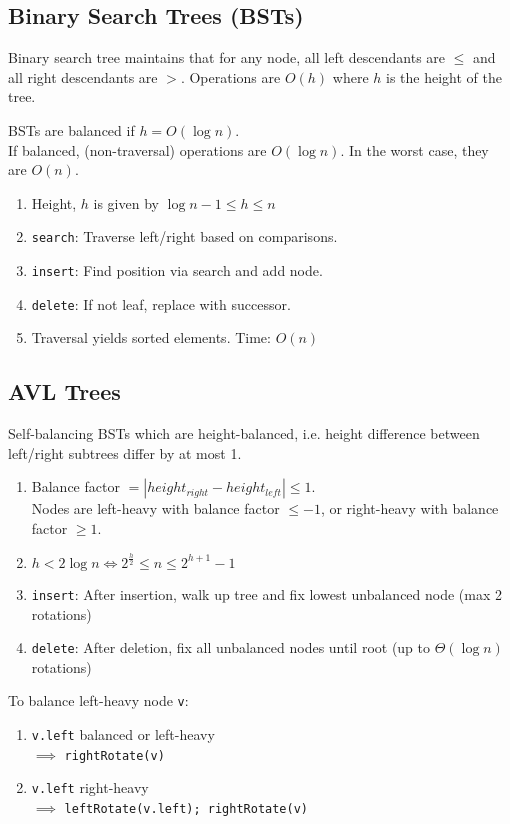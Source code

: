 \documentclass[12pt, a4paper]{article}
\begin{document}
\begin{multicols*}{3}
\subsection{Binary Search Trees (BSTs)}
Binary search tree maintains that for any node, all left descendants are $\leq$ and all right descendants are $>$. Operations are $O(h)$ where $h$ is the height of the tree.

BSTs are balanced if $h = O(\log n)$.\\If balanced, (non-traversal) operations are $O(\log n)$. In the worst case, they are $O(n)$.

\begin{enumerate}[\roman*.]
  \item Height, $h$ is given by $\log n -1 \leq h \leq n$
  \item \lstinline|search|: Traverse left/right based on comparisons.
  \item \lstinline|insert|: Find position via search and add node.
  \item \lstinline|delete|: If not leaf, replace with successor.
  \item Traversal yields sorted elements. Time: $O(n)$
\end{enumerate}


\subsection{AVL Trees}
Self-balancing BSTs which are height-balanced, i.e. height difference between left/right subtrees differ by at most 1. 

\begin{enumerate}[\roman*.]
  \item Balance factor $= |height_{right}-height_{left}| \leq 1$.\\Nodes are left-heavy with balance factor $\leq -1$, or right-heavy with balance factor $\geq 1$.
  \item $h < 2\log n \iff 2^{\frac{h}{2}} \leq n \leq 2^{h+1}-1$ 
  \item \lstinline|insert|: After insertion, walk up tree and fix lowest unbalanced node (max 2 rotations)
  \item \lstinline|delete|: After deletion, fix all unbalanced nodes until root (up to $\Theta(\log n)$ rotations)
\end{enumerate}

To balance left-heavy node \lstinline|v|:
\begin{enumerate}[\roman*.]
  \item \lstinline|v.left| balanced or left-heavy\\$\implies$ \lstinline|rightRotate(v)|
  \item \lstinline|v.left| right-heavy\\$\implies$ \lstinline|leftRotate(v.left); rightRotate(v)|
\end{enumerate}


\end{multicols*}
\end{document}
